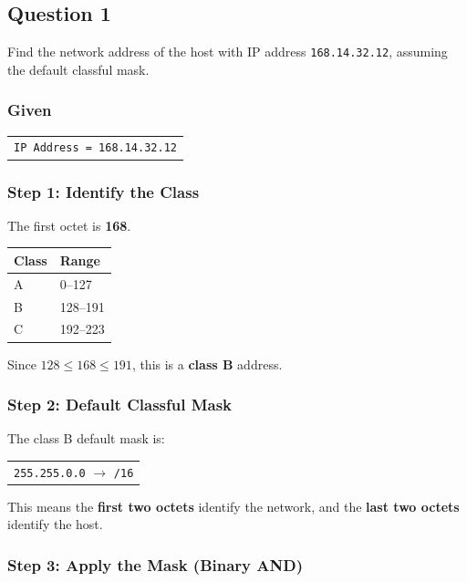 \documentclass[11pt,a4paper]{article}
\begin{document}
\subsection*{Question 1}
 
Find the network address of the host with IP address \texttt{168.14.32.12}, assuming the
default classful mask.
 
\subsubsection*{Given}
 
\begin{tabularx}{\textwidth}{@{}X@{}}
\texttt{IP Address = 168.14.32.12} \\
\end{tabularx}
 
\subsubsection*{Step 1: Identify the Class}
 
The first octet is \textbf{168}.
 
\begin{tabularx}{\textwidth}{@{}lX@{}}
\toprule
\rowcolor{tablehead}\textbf{Class} & \textbf{Range} \\
\midrule
A & 0--127 \\
B & 128--191 \\
C & 192--223 \\
\bottomrule
\end{tabularx}
 
Since $128 \le 168 \le 191$, this is a \textbf{class B} address.
 
\subsubsection*{Step 2: Default Classful Mask}
 
The class B default mask is:
 
\begin{tabularx}{\textwidth}{@{}X@{}}
\texttt{255.255.0.0} $\rightarrow$ \texttt{/16} \\
\end{tabularx}
 
This means the \textbf{first two octets} identify the network, and the \textbf{last two
octets} identify the host.
 
\subsubsection*{Step 3: Apply the Mask (Binary AND)}
 
\end{document}
